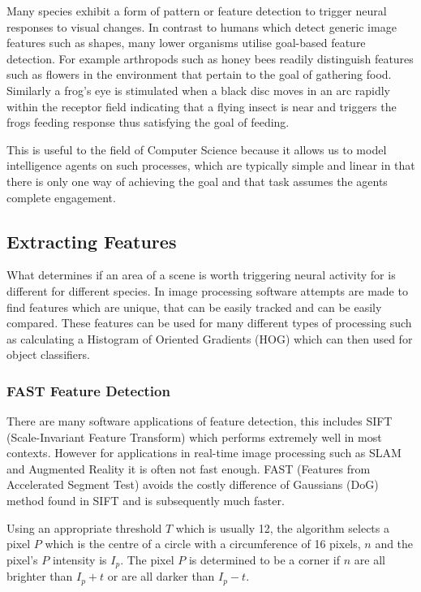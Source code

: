 \documentclass{mproj}
\begin{document}
Many species exhibit a form of pattern or feature detection to trigger neural responses to visual changes. In contrast to humans which detect generic image features such as shapes, many lower organisms utilise goal-based feature detection. For example arthropods such as honey bees readily distinguish features such as flowers in the environment that pertain to the goal of gathering food. Similarly a frog's eye is stimulated when a black disc moves in an arc rapidly within the receptor field indicating that a flying insect is near and triggers the frogs feeding response \cite{eyebrain} thus satisfying the goal of feeding.

This is useful to the field of Computer Science because it allows us to model intelligence agents on such processes, which are typically simple and linear in that there is only one way of achieving the goal and that task assumes the agents complete engagement.

\subsection{Extracting Features}

What determines if an area of a scene is worth triggering neural activity for is different for different species. In image processing software attempts are made to find features which are unique, that can be easily tracked and can be easily compared. These features can be used for many different types of processing such as calculating a Histogram of Oriented Gradients (HOG) which can then used for object classifiers.

\subsubsection{FAST Feature Detection}

There are many software applications of feature detection, this includes SIFT (Scale-Invariant Feature Transform) which performs extremely well in most contexts\cite{Mikolajczyk}. However for applications in real-time image processing such as SLAM and Augmented Reality it is often not fast enough. FAST (Features from Accelerated Segment Test) \cite{rosten_2006_machine}\cite{rosten_2005_annotations} avoids the costly difference of Gaussians (DoG) method found in SIFT and is subsequently much faster.

Using an appropriate threshold $T$ which is usually 12, the algorithm selects a pixel $P$ which is the centre of a circle with a circumference of 16 pixels, $n$ and the pixel's $P$ intensity is $I_{p}$. The pixel $P$ is determined to be a corner if $n$ are all brighter than $I_{p} + t$ or are all darker than $I_{p} - t$. 
\end{document}
